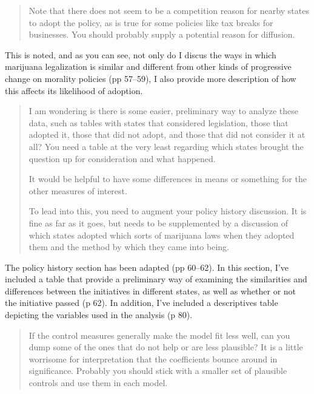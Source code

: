 \documentclass[12pt,stdletter,dateno,sigleft]{newlfm} %
\begin{document}
\begin{newlfm}
\begin{quotation}{\color{red}\noindent \footnotesize
Note that there does not seem to be a competition reason for nearby states to adopt the policy, as is true for some policies like tax breaks for businesses.  You should probably supply a potential reason for diffusion.
}
\end{quotation}

This is noted, and as you can see, not only do I discus the ways in which marijuana legalization is similar and different from other kinds of progressive change on morality policies (pp 57--59), I also provide more description of how this affects its likelihood of adoption.



\begin{quotation}{\color{red}\noindent \footnotesize
I am wondering is there is some easier, preliminary way to analyze these data, such as tables with states that considered legislation, those that adopted it, those that did not adopt, and those that did not consider it at all?   You need a table at the very least regarding which states brought the question up for consideration and what happened. \newline

\noindent It would be helpful to have some differences in means or something for the other measures of interest. \newline

\noindent To lead into this, you need to augment your policy history discussion.  It is fine as far as it goes, but needs to be supplemented by a discussion of which states adopted which sorts of marijuana laws when they adopted them and the method by which they came into being.
}
\end{quotation}



The policy history section has been adapted (pp 60--62). In this section, I've included a table that provide a preliminary way of examining the similarities and differences between the initiatives in different states, as well as whether or not the initiative passed (p 62). In addition, I've included a descriptives table depicting the variables used in the analysis (p 80).

\begin{quotation}{\color{red}\noindent \footnotesize
If the control measures generally make the model fit less well, can you dump some of the ones that do not help or are less plausible?  It is a little worrisome for interpretation that the coefficients bounce around in significance.  Probably you should stick with a smaller set of plausible controls and use them in each model.\newline

}
\end{quotation}
\end{newlfm}
\end{document}
